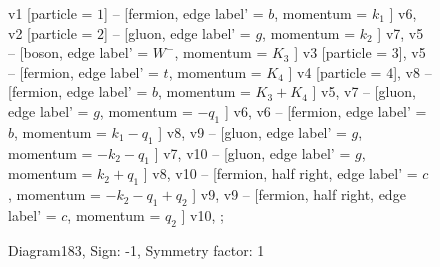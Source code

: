 \documentclass{revtex4}
\begin{document}
\begin{figure}[!htb]
\begin{center}
{    %
v1 [particle = \(1\)] -- [fermion, edge label' = \(b\), momentum = \(k_{1}\) ] v6, 
v2 [particle = \(2\)] -- [gluon, edge label' = \(g\), momentum = \(k_{2}\) ] v7, 
v5 -- [boson, edge label' = \(W^{-}\), momentum = \(K_{3}\) ] v3 [particle = \(3\)], 
v5 -- [fermion, edge label' = \(t\), momentum = \(K_{4}\) ] v4 [particle = \(4\)], 
v8 -- [fermion, edge label' = \(b\), momentum = \(K_{3} + K_{4}\) ] v5, 
v7 -- [gluon, edge label' = \(g\), momentum = \(-q_{1}\) ] v6, 
v6 -- [fermion, edge label' = \(b\), momentum = \(k_{1} - q_{1}\) ] v8, 
v9 -- [gluon, edge label' = \(g\), momentum = \(-k_{2} - q_{1}\) ] v7, 
v10 -- [gluon, edge label' = \(g\), momentum = \(k_{2} + q_{1}\) ] v8, 
v10 -- [fermion, half right, edge label' = \(c\), momentum = \(-k_{2} - q_{1} + q_{2}\) ] v9, 
v9 -- [fermion, half right, edge label' = \(c\), momentum = \(q_{2}\) ] v10, 
};
\end{center}
\caption{Diagram183, Sign: -1, Symmetry factor: 1}
\end{figure}
\newpage
\end{document}
